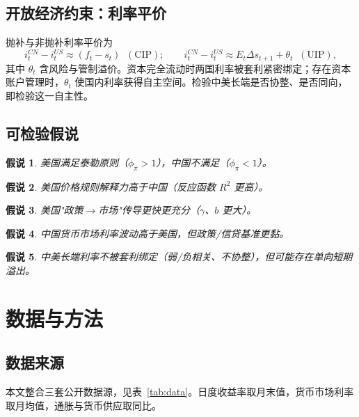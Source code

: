 \documentclass[12pt,a4paper]{ctexart}
\newtheorem{hypothesis}{假说}
\begin{document}
\subsection{开放经济约束：利率平价}
抛补与非抛补利率平价为
\begin{equation}
i_t^{CN} - i_t^{US} \approx (f_t - s_t)\;\;(\text{CIP});\qquad
i_t^{CN}-i_t^{US} \approx E_t\Delta s_{t+1} + \theta_t\;\;(\text{UIP}),
\end{equation}
其中 $\theta_t$ 含风险与管制溢价。资本完全流动时两国利率被套利紧密绑定；存在资本账户管理时，$\theta_t$ 使国内利率获得自主空间。检验中美长端是否协整、是否同向，即检验这一自主性。

\subsection{可检验假说}
\begin{hypothesis}\label{h1} 美国满足泰勒原则（$\phi_\pi>1$），中国不满足（$\phi_\pi<1$）。\end{hypothesis}
\begin{hypothesis}\label{h2} 美国价格规则解释力高于中国（反应函数 $R^2$ 更高）。\end{hypothesis}
\begin{hypothesis}\label{h3} 美国"政策$\to$市场"传导更快更充分（$\gamma$、$b$ 更大）。\end{hypothesis}
\begin{hypothesis}\label{h4} 中国货币市场利率波动高于美国，但政策/信贷基准更黏。\end{hypothesis}
\begin{hypothesis}\label{h5} 中美长端利率不被套利绑定（弱/负相关、不协整），但可能存在单向短期溢出。\end{hypothesis}

\section{数据与方法}

\subsection{数据来源}
本文整合三套公开数据源，见表~\ref{tab:data}。日度收益率取月末值，货币市场利率取月均值，通胀与货币供应取同比。
\end{document}
